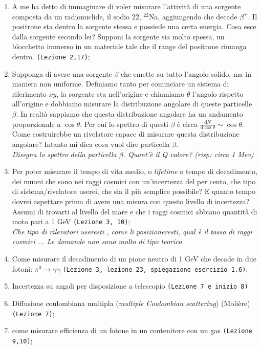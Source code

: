 \documentclass[../main.tex]{subfiles}
\begin{document}
\begin{enumerate}
    \item A me ha detto di immaginare di voler misurare l'attività di una sorgente composta da un radionuclide, il sodio 22, $^{22}$Na, aggiungendo che decade $\beta^+$. Il positrone sta dentro la sorgente stessa e possiede una certa energia. Cosa esce dalla sorgente secondo lei? Supponi la sorgente sia molto spessa, un blocchetto immerso in un materiale tale che il range del positrone rimanga dentro. \texttt{(Lezione 2,17)};
    \item Supponga di avere una sorgente $\beta$ che emette su tutto l'angolo solido, ma in maniera non uniforme. Definiamo tanto per cominciare un sistema di riferimento $xy$, la sorgente sta nell'origine e chiamiamo $\theta$ l'angolo rispetto all'origine e dobbiamo misurare la distribuzione angolare di queste particelle $\beta$. In realtà sappiamo che questa distribuzione angolare ha un andamento proporzionale a $\cos\theta$. Per cui lo spettro di questi $\beta$ è circa \(\frac{\textrm{d}N}{\textrm{d}\cos\theta}\sim \cos\theta \). Come costruirebbe un rivelatore capace di misurare questa distribuzione angolare? Intanto mi dica cosa vuol dire particella $\beta$. \\
    \textit{Disegna lo spettro della particella $\beta$. Quant'è il Q valore? (risp: circa 1 Mev)}
    \item Per poter misurare il tempo di vita medio, o \textit{lifetime} o tempo di decadimento, dei muoni che sono nei raggi cosmici con un'incertezza del per cento, che tipo di sistema/rivelatore userei, che sia il più semplice possibile? E quanto tempo dovrei aspettare prima di avere una misura con questo livello di incertezza? Assumi di trovarti al livello del mare e che i raggi cosmici abbiano quantità di moto pari a 1 GeV \texttt{(Lezione 3, 10)};\\
    \textit{Che tipo di rilevatori useresti , come li posizioneresti, qual è il tasso di raggi cosmici ... Le domande non sono molto di tipo teorico}
    \item Come misurare il decadimento di un pione neutro di 1 GeV che decade in due fotoni: \(\pi^0\to\gamma\gamma\) \texttt{(Lezione 3, lezione 23, spiegazione esercizio 1.6)};
    \item Incertezza su angoli per disposizione a telescopio \texttt{(Lezione 7 e inizio 8)}
    \item Diffusione coulombiana multipla (\textit{multiple Coulombian scattering}) (Molière) \texttt{(Lezione 7)};
    \item come misurare efficienza di un fotone in un contenitore con un gas \texttt{(Lezione 9,10)};\\

\end{enumerate}
\end{document}
